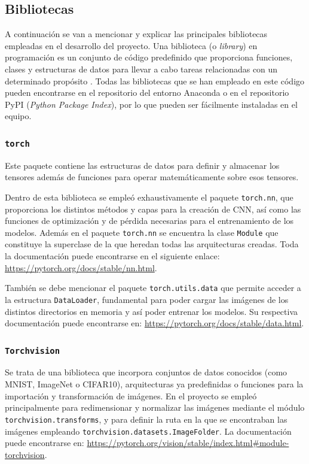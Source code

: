 \subsection{Bibliotecas}

A continuación se van a mencionar y explicar las principales bibliotecas empleadas en el desarrollo del proyecto. Una biblioteca (o \textit{library}) en programación es un conjunto de código predefinido que proporciona funciones, clases y estructuras de datos para llevar a cabo tareas relacionadas con un determinado propósito \cite{met:libreria}. Todas las bibliotecas que se han empleado en este código pueden encontrarse en el repositorio del entorno Anaconda o en el repositorio PyPI (\textit{Python Package Index}), por lo que pueden ser fácilmente instaladas en el equipo.

\subsubsection{\texttt{torch}}

Este paquete contiene las estructuras de datos para definir y almacenar los tensores además de funciones para operar matemáticamente sobre esos tensores. 

Dentro de esta biblioteca se empleó exhaustivamente el paquete \texttt{torch.nn}, que proporciona los distintos métodos y capas para la creación de CNN, así como las funciones de optimización y de pérdida necesarias para el entrenamiento de los modelos. Además en el paquete \texttt{torch.nn} se encuentra la clase \texttt{Module} que constituye la superclase de la que heredan todas las arquitecturas creadas. Toda la documentación puede encontrarse en el siguiente enlace: \url{https://pytorch.org/docs/stable/nn.html}.

También se debe mencionar el paquete \texttt{torch.utils.data} que permite acceder a la estructura \texttt{DataLoader}, fundamental para poder cargar las imágenes de los distintos directorios en memoria y así poder entrenar los modelos. Su respectiva documentación puede encontrarse en: \url{https://pytorch.org/docs/stable/data.html}.

\subsubsection{\texttt{Torchvision}}

Se trata de una biblioteca que incorpora conjuntos de datos conocidos (como MNIST, ImageNet o CIFAR10), arquitecturas ya predefinidas o funciones para la importación y transformación de imágenes. En el proyecto se empleó principalmente para redimensionar y normalizar las imágenes mediante el módulo \texttt{torchvision.transforms}, y para definir la ruta en la que se encontraban las imágenes empleando \texttt{torchvision.datasets.ImageFolder}. La documentación puede encontrarse en: \url{https://pytorch.org/vision/stable/index.html#module-torchvision}.

